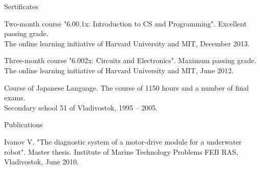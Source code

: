\documentclass{template}
\begin{document}
\begin{rSection}{Sertificates}

\begin{rItemize}
\item Two-month course "6.00.1x: Introduction to CS and Programming".  Excellent passing grade. \\
The online learning initiative of Harvard University and MIT, December 2013.
\item Three-month course "6.002x: Circuits and Electronics". Maximum passing grade. \\
The online learning initiative of Harvard University and MIT, June 2012.
\item Course of Japanese Language. The course of 1150 hours and a number of final exams. \\
Secondary school 51 of Vladivostok, 1995 -- 2005.
\end{rItemize}

\end{rSection}


\begin{rSection}{Publications}

\begin{rItemize}
\item Ivanov V. "The diagnostic system of a motor-drive module for a underwater robot". Master thesis. Institute of Marine Technology Problems FEB RAS, Vladivostok, June 2010.
\end{rItemize}

\end{rSection}

\end{document}
